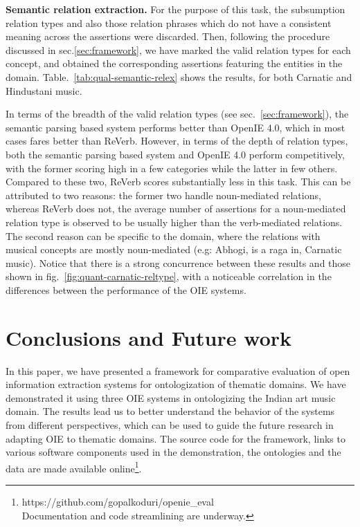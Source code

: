 \documentclass{llncs}
\begin{document}
\medskip
\noindent
\textbf{Semantic relation extraction.}
For the purpose of this task, the subsumption relation types and also those relation phrases which do not have a consistent meaning across the assertions were discarded. Then, following the procedure discussed in sec.\ref{sec:framework}, we have marked the valid relation types for each concept, and obtained the corresponding assertions featuring the entities in the domain. Table.~\ref{tab:qual-semantic-relex} shows the results, for both Carnatic and Hindustani music. 

In terms of the breadth of the valid relation types (see sec.~\ref{sec:framework}), the semantic parsing based system performs better than OpenIE 4.0, which in most cases fares better than ReVerb. However, in terms of the depth of relation types, both the semantic parsing based system and OpenIE 4.0 perform competitively, with the former scoring high in a few categories while the latter in few others. Compared to these two, ReVerb scores substantially less in this task. This can be attributed to two reasons: the former two handle noun-mediated relations, whereas ReVerb does not, the average number of assertions for a noun-mediated relation type is observed to be usually higher than the verb-mediated relations. The second reason can be specific to the domain, where the relations with musical concepts are mostly noun-mediated (e.g: Abhogi, is a raga in, Carnatic music). Notice that there is a strong concurrence between these results and those shown in fig.~\ref{fig:quant-carnatic-reltype}, with a noticeable correlation in the differences between the performance of the OIE systems.

\section{Conclusions and Future work}
\label{sec:conclusions}
In this paper, we have presented a framework for comparative evaluation of open information extraction systems for ontologization of thematic domains. We have demonstrated it using three OIE systems in ontologizing the Indian art music domain. The results lead us to better understand the behavior of the systems from different perspectives, which can be used to guide the future research in adapting OIE to thematic domains. The source code for the framework, links to various software components used in the demonstration, the ontologies and the data are made available online\footnote{https://github.com/gopalkoduri/openie\_eval\\Documentation and code streamlining are underway.}. 
\end{document}
